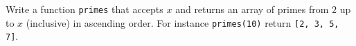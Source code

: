 Write a function \verb!primes! that accepts $x$
  and returns an array of primes from $2$ up to $x$ (inclusive) in
  ascending order.
  For instance \verb!primes(10)! return \verb![2, 3, 5, 7]!.
